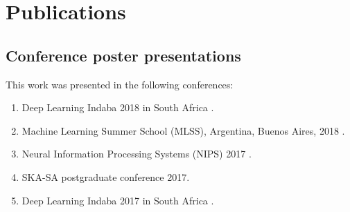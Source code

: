 \chapter*{Publications}

\section*{Conference poster presentations}

This work was presented in the following conferences:
\begin{enumerate}
\item Deep Learning Indaba 2018 in South Africa \citep{DLI}.
\item Machine Learning Summer School (MLSS), Argentina, Buenos Aires, 2018  \citep{MLSS}.
\item Neural Information Processing Systems (NIPS) 2017 \citep{NIPS}.
\item SKA-SA postgraduate conference 2017.
\item Deep Learning Indaba 2017 in South Africa \citep{DLI}.





\end{enumerate} 

 